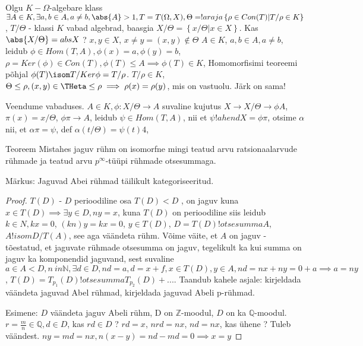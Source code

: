\documentclass[12pt]{report}
\numberwithin{equation}{section}
\theoremstyle{definition}
\theoremstyle{plain}
\begin{document}
Olgu $K - \Omega$-algebare klass
$\exists A \in K, \exists a,b \in A, a \neq b, \abs{A} > 1, T = T(\Omega,X), \Theta = !araja \left\lbrace \rho \in Con(T) | T/ \rho \in K \right\rbrace$, $T / \Theta $ - klassi $K$ vabad algebrad, baasgia $X / \Theta = \left\lbrace x / \Theta | x \in X \right\rbrace$. Kas $\abs{X / \Theta} = abs{X}$ ? $x,y \in X$, $x \neq y = (x,y) \not \in \Theta$
$A \in K$, $a,b \in A, a \neq b$, leidub $\phi \in Hom(T,A), \phi(x) = a, \phi(y) = b$, $\rho = Ker(\phi) \in Con(T), \phi(T) \leq A \implies \phi(T) \in K$, Homomorfisimi teoreemi põhjal $\phi(T) \isom T/Ker \phi = T / \rho$. $T/ \rho \in K$, $\Theta \leq \rho, (x,y) \in \THeta \leq \rho \implies \rho(x) = \rho(y)$, mis on vastuolu. Järk on sama!

Veendume vabaduses. $A \in K, \phi: X/ \Theta \to A$ suvaline kujutus $X \to X/ \Theta \to \phi A$, $\pi(x) = x/ \Theta$, $\phi \pi \to A$, leidub $\psi \in Hom(T,A)$, nii et $\psi !ahend X = \phi \pi$, otsime $\alpha$ nii, et $\alpha \pi = \psi$, def $\alpha(t/ \Theta) = \psi(t)4$, 


Teoreem Mistahes jaguv r\"uhm on isomorfne mingi teatud arvu ratsionaalarvude r\"uhmade ja teatud arvu $p^\infty$-t\"u\"upi r\"uhmade otsesummaga.

Märkus: Jaguvad Abei r\"uhmad täilikult kategoriseeritud.
\begin{proof}
$T(D)$ - $D$ perioodiline osa $T(D) < D$ , on jaguv kuna $x \in T(D) \implies \exists y \in D, ny = x$, kuna $T(D)$ on perioodiline siis leidub $k \in N, kx = 0$, $(kn)y = kx = 0$, $y \in T(D)$, $D = T(D) !otsesumma A$, $A !isom D/T(A)$, see aga väändeta r\"uhm. Võime väite, et $A$ on jaguv - tõestatud, et jaguvate r\"uhmade otsesumma on jaguv, tegelikult ka kui summa on jaguv ka komponendid jaguvand, sest suvaline $ a \in A < D , n \ in \mathbb{N}, \exists d \in D, nd = a, d = x +f, x \in T(D), y \in A, nd = nx + ny = 0 + a \implies a = ny$, $T(D) = T_{p_1}(D) !otsesumma T_{p_2}(D) + ....$ Taandub kahele asjale: kirjeldada väändeta jaguvad Abel r\"uhmad, kirjeldada jaguvad Abeli p-r\"uhmad.

Esimene: $D$ väändeta jaguv Abeli r\"uhm, D on $\mathbb{Z}$-moodul, $D$ on ka $\mathbb{Q}$-moodul. $r = \frac{m}{n} \in \mathbb{Q}, d \in D$, kas $rd \in D$ ? $rd = x$, $nrd = nx$, $nd=nx$, kas \"uhene ? Tuleb väändest. $ny = md = nx, n(x-y) = nd-md = 0 \implies x=y$
\end{proof} 
\end{document}

